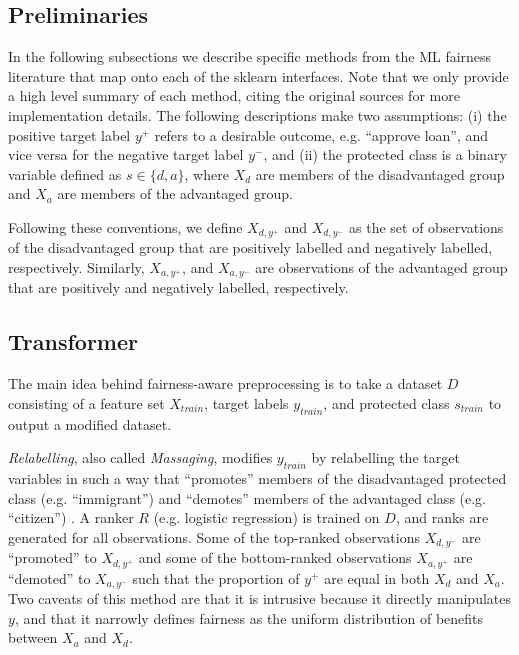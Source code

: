 \documentclass{{interact/interact}}
\begin{document}
\subsection{Preliminaries} In the following subsections we describe specific
methods from the ML fairness literature that map onto each of the sklearn
interfaces. Note that we only provide a high level summary of each method,
citing the original sources for more implementation details. The following
descriptions make two assumptions: (i) the positive target label \(y^{+}\)
refers to a desirable outcome, e.g. ``approve loan'', and vice versa for the
negative target label \(y^{-}\), and (ii) the protected class is a binary
variable defined as \(s \in \{d, a\}\), where \(X_d\)  are members of the
disadvantaged group and \(X_a\) are members of the advantaged group.

Following these conventions, we define \(X_{d, y^{+}}\) and \(X_{d, y^{-}}\)
as the set of observations of the disadvantaged group that are positively
labelled and negatively labelled, respectively. Similarly, \(X_{a, y^{+}}\), and
\(X_{a, y^{-}}\)  are observations of the advantaged group that are positively
and negatively labelled, respectively.

\subsection{Transformer} The main idea behind fairness-aware preprocessing is to
take a dataset \(D\) consisting of a feature set \(X_{train}\), target labels
\(y_{train}\), and protected class \(s_{train}\) to output a modified dataset.

\emph{Relabelling}, also called \emph{Massaging}, modifies \(y_{train}\) by relabelling
the target variables in such a way that ``promotes'' members of the
disadvantaged protected class (e.g. ``immigrant'') and ``demotes'' members of
the advantaged class (e.g. ``citizen'') \cite{kamiran2012data}. A ranker \(R\)
(e.g. logistic regression) is trained on \(D\), and ranks are generated for
all observations. Some of the top-ranked observations \(X_{d, y^{-}}\)  are
``promoted'' to \(X_{d, y^{+}}\) and some of the bottom-ranked observations
\(X_{a, y^{+}}\)  are ``demoted'' to \(X_{a, y^{-}}\) such that the proportion
of \(y^{+}\) are equal in both \(X_d\) and \(X_a\). Two caveats of this method
are that it is intrusive because it directly manipulates \(y\), and that it
narrowly defines fairness as the uniform distribution of benefits between
\(X_a\) and \(X_d\).
\end{document}
